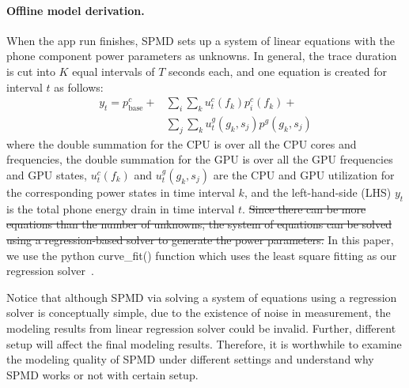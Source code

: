 \paragraph{Offline model derivation.} 
%
When the app run finishes, SPMD sets up a system of linear
equations with the phone component power parameters as unknowns.  In
general, the trace duration is cut into $K$ equal intervals of $T$
seconds each, and one equation is created for interval $t$ as follows:
\begin{align}
y_t = p^{c}_{\text{base}} +& \sum_i\sum_k{u^c_t(f_k)p_i^{c}(f_{k})} + \nonumber \\
        & \sum_{j}\sum_{k} u^g_t(g_k,s_j)p^{g}(g_k, s_j)
\end{align}
where the double summation for the CPU is over all the CPU cores and frequencies,
the double summation for the GPU is over all the GPU frequencies and GPU states,
$u^c_t(f_k)$ and $u^g_t(g_k,s_j)$ are the CPU and GPU utilization for the corresponding power states
in time interval $k$,
and the left-hand-side (LHS) $y_t$ is the total phone energy drain in time interval $t$.
\st{Since there can be more equations than the number of unknowns, 
the system of equations can be solved using a regression-based
solver to generate the power parameters.} In this paper, we use
the python curve\_fit() function which uses {\color{blue}the}
least square fitting as our regression solver~\cite{curvefit}.

Notice that although SPMD via solving a system of equations using a regression solver is
conceptually simple{\color{blue}, due to the existence of noise in measurement, the modeling results from linear regression solver could be invalid. Further, different setup will affect the final modeling results. Therefore, it is worthwhile to examine the modeling quality of SPMD under different settings and understand why SPMD works or not with certain setup.}

